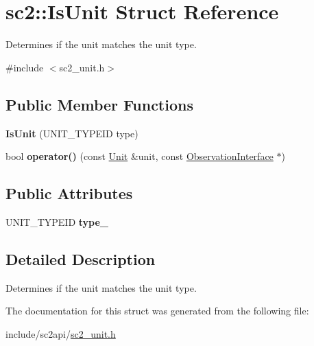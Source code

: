 \hypertarget{structsc2_1_1_is_unit}{}\section{sc2\+:\+:Is\+Unit Struct Reference}
\label{structsc2_1_1_is_unit}


Determines if the unit matches the unit type.  




{\ttfamily \#include $<$sc2\+\_\+unit.\+h$>$}

\subsection*{Public Member Functions}
\begin{DoxyCompactItemize}
\item 
\mbox{\label{structsc2_1_1_is_unit_ac2017bcac8de9e3d3c70a80ecb00503a}} 
{\bfseries Is\+Unit} (U\+N\+I\+T\+\_\+\+T\+Y\+P\+E\+ID type)
\item 
\mbox{\label{structsc2_1_1_is_unit_aada38b590d8ee104190c04a756b4df18}} 
bool {\bfseries operator()} (const \hyperlink{classsc2_1_1_unit}{Unit} \&unit, const \hyperlink{classsc2_1_1_observation_interface}{Observation\+Interface} $\ast$)
\end{DoxyCompactItemize}
\subsection*{Public Attributes}
\begin{DoxyCompactItemize}
\item 
\mbox{\label{structsc2_1_1_is_unit_abf70a6314708ccc3266c65a69dfd24fb}} 
U\+N\+I\+T\+\_\+\+T\+Y\+P\+E\+ID {\bfseries type\+\_\+}
\end{DoxyCompactItemize}


\subsection{Detailed Description}
Determines if the unit matches the unit type. 

The documentation for this struct was generated from the following file\+:\begin{DoxyCompactItemize}
\item 
include/sc2api/\hyperlink{sc2__unit_8h}{sc2\+\_\+unit.\+h}\end{DoxyCompactItemize}

